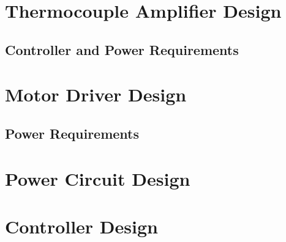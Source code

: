 \documentclass[10pt, twocolumn]{article}
\begin{document}
\section{Thermocouple Amplifier Design}

\subsection{Controller and Power Requirements}

\section{Motor Driver Design}

\subsection{Power Requirements}

\section{Power Circuit Design}

\section{Controller Design}
\end{document}
